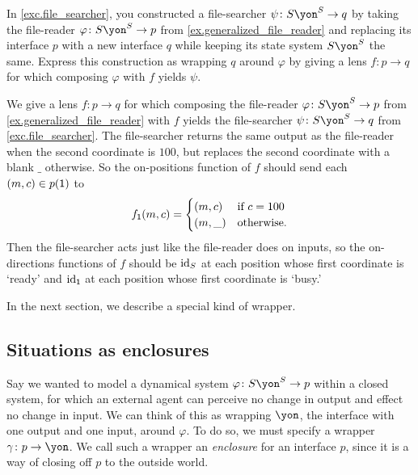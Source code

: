 \documentclass[Book-Poly]{subfiles}
\begin{document}
\begin{exercise} \label{exc.file_searcher_wrap}
In \cref{exc.file_searcher}, you constructed a file-searcher $\psi\colon S\yon^S\to q$ by taking the file-reader $\varphi\colon S\yon^S\to p$ from \cref{ex.generalized_file_reader} and replacing its interface $p$ with a new interface $q$ while keeping its state system $S\yon^S$ the same.
Express this construction as wrapping $q$ around $\varphi$ by giving a lens $f\colon p\to q$ for which composing $\varphi$ with $f$ yields $\psi$.
\begin{solution}
We give a lens $f\colon p\to q$ for which composing the file-reader $\varphi\colon S\yon^S\to p$ from \cref{ex.generalized_file_reader} with $f$ yields the file-searcher $\psi\colon S\yon^S\to q$ from \cref{exc.file_searcher}.
The file-searcher returns the same output as the file-reader when the second coordinate is $100$, but replaces the second coordinate with a blank $\_$ otherwise.
So the on-positions function of $f$ should send each $(m,c)\in p(\textsf{1})$ to
\[
    f_{\textsf{1}}(m,c) =
        \begin{cases}
            (m,c) & \text{if } c = 100 \\
            (m,\_) & \text{otherwise}.
        \end{cases}
\]
Then the file-searcher acts just like the file-reader does on inputs, so the on-directions functions of $f$ should be $\mathrm{id}_S$ at each position whose first coordinate is `ready' and $\mathrm{id}_{\textsf{1}}$ at each position whose first coordinate is `busy.'
\end{solution}
\end{exercise}

In the next section, we describe a special kind of wrapper.

\subsection{Situations as enclosures}\label{subsec.poly.dyn_sys.new.sit_encl}
Say we wanted to model a dynamical system $\varphi\colon S\yon^S\to p$ within a closed system, for which an external agent can perceive no change in output and effect no change in input.
We can think of this as wrapping $\yon$, the interface with one output and one input, around $\varphi$.
To do so, we must specify a wrapper $\gamma\colon p\to\yon$.
We call such a wrapper an \emph{enclosure} for an interface $p$, since it is a way of closing off $p$ to the outside world.
\end{document}
